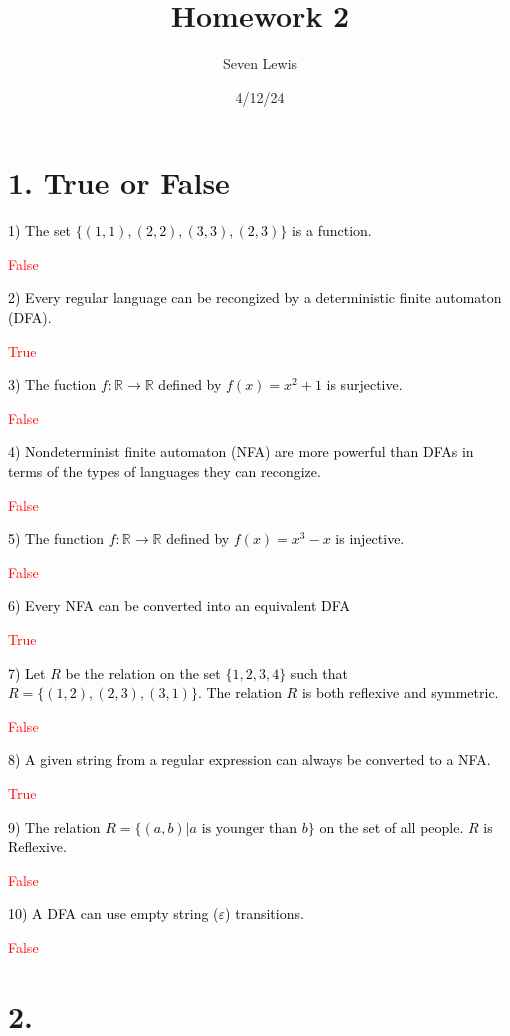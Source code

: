 \documentclass{article}
\title{Homework 2}
\author{Seven Lewis}
\date{4/12/24}
\newcommand{\problem}[1]{\noindent\textcolor{black}{#1}}
\newcommand{\solution}[1]{\noindent\textcolor{red}{#1}}
\begin{document}
\maketitle


\section*{1. True or False}
\problem{1) The set $\{(1,1),(2,2),(3,3),(2,3)\}$ is a function.}

\solution{False}

\problem{2) Every regular language can be recongized by a deterministic finite automaton (DFA).}

\solution{True}

\problem{3) The fuction $f: \mathbb R \rightarrow \mathbb R$ defined by $f(x) = x^2 + 1$ is surjective.}

\solution{False}

\problem{4) Nondeterminist finite automaton (NFA) are more powerful than DFAs in terms of the
types of languages they can recongize.}

\solution{False}

\problem{5) The function $f: \mathbb R \rightarrow \mathbb R$ defined by $f(x) = x^3 - x$ is
injective.}

\solution{False}

\problem{6) Every NFA can be converted into an equivalent DFA}

\solution{True}

\problem{7) Let $R$ be the relation on the set $\{1,2,3,4\}$ such that $R =\{(1,2),(2,3),(3,1)\}$.
The relation $R$ is both reflexive and symmetric.}

\solution{False}

\problem{8) A given string from a regular expression can always be converted to a NFA.}

\solution{True}

\problem{9) The relation $R = \{(a,b) | a \text{ is younger than } b\}$ on the set of all people.
$R$ is Reflexive.}

\solution{False}

\problem{10) A DFA can use empty string ($\varepsilon$) transitions.}

\solution{False}

\vspace*{22em}

\section*{2. }
\end{document}
